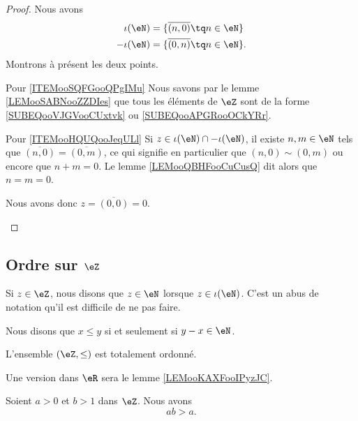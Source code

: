 \begin{proof}
	Nous avons
	\begin{subequations}
		\begin{align}
			\iota(\eN)  & =\{ \overline{ (n,0) }\tq n\in \eN \}    \label{SUBEQooVJGVooCUxtvk} \\
			-\iota(\eN) & =\{ \overline{ (0,n) }\tq n\in \eN \}.   \label{SUBEQooAPGRooOCkYRr}
		\end{align}
	\end{subequations}
	Montrons à présent les deux points.
	\begin{subproof}
		\item[Pour \ref{ITEMooSQFGooQPgIMu}]
		Nous savons par le lemme \ref{LEMooSABNooZZDIes} que tous les éléments de \( \eZ\) sont de la forme \eqref{SUBEQooVJGVooCUxtvk} ou \eqref{SUBEQooAPGRooOCkYRr}.
		\item[Pour \ref{ITEMooHQUQooJeqULl}]
		Si \( z\in \iota(\eN)\cap -\iota(\eN)\), il existe \( n,m\in \eN\) tels que \( \overline{ (n,0) }=\overline{ (0,m) }\), ce qui signifie en particulier que \( (n,0)\sim(0,m)\) ou encore que \( n+m=0\). Le lemme \ref{LEMooQBHFooCuCusQ} dit alors que \( n=m=0\).

		Nous avons donc \( z= \overline{ (0,0) }=0\).
	\end{subproof}
\end{proof}

\subsection{Ordre sur \( \eZ\)}

Si \( z\in \eZ\), nous disons que \( z\in \eN\) lorsque \( z\in \iota(\eN)\). C'est un abus de notation qu'il est difficile de ne pas faire.

\begin{propositionDef}       \label{PROPooMYYDooOABOdB}
	Nous disons que \( x\leq y\) si et seulement si \( y-x\in \eN\).

	L'ensemble \( (\eZ, \leq)\) est totalement ordonné.
\end{propositionDef}

Une version dans \( \eR\) sera le lemme \ref{LEMooKAXFooIPyzJC}.
\begin{lemma}       \label{LEMooSVDDooWsyxNP}
	Soient \( a>0\) et \( b>1\) dans \( \eZ\). Nous avons
	\begin{equation}
		ab>a.
	\end{equation}
\end{lemma}

